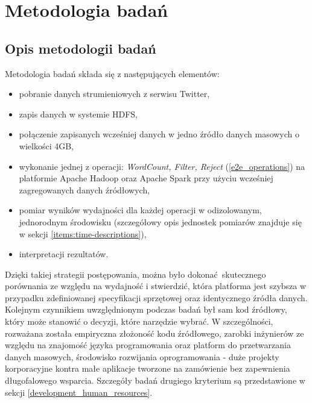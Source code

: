 \chapter{Metodologia badań} \label{chap.technology-stack}
\section{Opis metodologii badań}
Metodologia badań składa się z następujących elementów:
\begin{itemize}
	\item pobranie danych strumieniowych z serwisu Twitter,
	\item zapis danych w systemie HDFS,
	\item połączenie zapisanych wcześniej danych w jedno źródło danych masowych o wielkości 4GB,
	\item wykonanie jednej z operacji: \textit{WordCount, Filter, Reject} (\ref{e2e_operations}) na platformie Apache Hadoop oraz Apache Spark przy użyciu wcześniej zagregowanych danych źródłowych,
	\item pomiar wyników wydajności dla każdej operacji w odizolowanym, jednorodnym środowisku (szczegółowy opis jednostek pomiarów znajduje się w sekcji \ref{items:time-descriptions}),
	\item interpretacji rezultatów.
\end{itemize}
Dzięki takiej strategii postępowania, można było dokonać skutecznego porównania ze względu na wydajność i stwierdzić, która platforma jest szybsza w przypadku zdefiniowanej specyfikacji sprzętowej oraz identycznego źródła danych. Kolejnym czynnikiem uwzględnionym podczas badań był sam kod źródłowy, który może stanowić o decyzji, które narzędzie wybrać. W szczególności, rozważana została empiryczna złożoność kodu źródłowego, zarobki inżynierów ze względu na znajomość języka programowania oraz platform do przetwarzania danych masowych, środowisko rozwijania oprogramowania - duże projekty korporacyjne kontra małe aplikacje tworzone na zamówienie bez zapewnienia długofalowego wsparcia. Szczegóły badań drugiego kryterium są przedstawione w sekcji \ref{development_human_resources}.  
